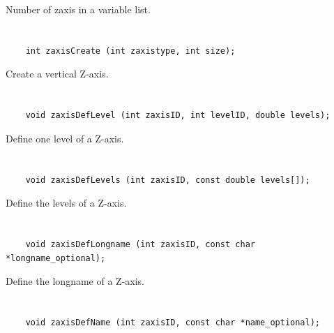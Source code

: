 Number of zaxis in a variable list.


\section*{\tt {}}

\begin{verbatim}
    int zaxisCreate (int zaxistype, int size);
\end{verbatim}

Create a vertical Z-axis.


\section*{\tt {}}

\begin{verbatim}
    void zaxisDefLevel (int zaxisID, int levelID, double levels);
\end{verbatim}

Define one level of a Z-axis.


\section*{\tt {}}

\begin{verbatim}
    void zaxisDefLevels (int zaxisID, const double levels[]);
\end{verbatim}

Define the levels of a Z-axis.


\section*{\tt {}}

\begin{verbatim}
    void zaxisDefLongname (int zaxisID, const char *longname_optional);
\end{verbatim}

Define the longname of a Z-axis.


\section*{\tt {}}

\begin{verbatim}
    void zaxisDefName (int zaxisID, const char *name_optional);
\end{verbatim}

